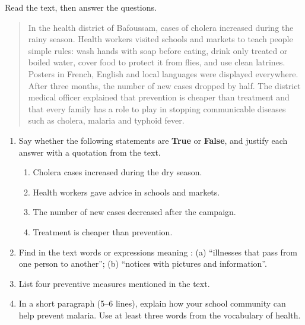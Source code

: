 \documentclass[11pt]{article}
\begin{document}
\begin{exercice}
Read the text, then answer the questions.

\begin{quote}
In the health district of Bafoussam, cases of cholera increased during the rainy season. Health workers visited schools and markets to teach people simple rules: wash hands with soap before eating, drink only treated or boiled water, cover food to protect it from flies, and use clean latrines. Posters in French, English and local languages were displayed everywhere. After three months, the number of new cases dropped by half. The district medical officer explained that prevention is cheaper than treatment and that every family has a role to play in stopping communicable diseases such as cholera, malaria and typhoid fever.
\end{quote}

\begin{enumerate}
\item Say whether the following statements are \textbf{True} or \textbf{False}, and justify each answer with a quotation from the text.
\begin{enumerate}
\item Cholera cases increased during the dry season.
\item Health workers gave advice in schools and markets.
\item The number of new cases decreased after the campaign.
\item Treatment is cheaper than prevention.
\end{enumerate}
\item Find in the text words or expressions meaning : (a) ``illnesses that pass from one person to another''; (b) ``notices with pictures and information''.
\item List four preventive measures mentioned in the text.
\item In a short paragraph (5--6 lines), explain how your school community can help prevent malaria. Use at least three words from the vocabulary of health.
\end{enumerate}
\end{exercice}
\end{document}
